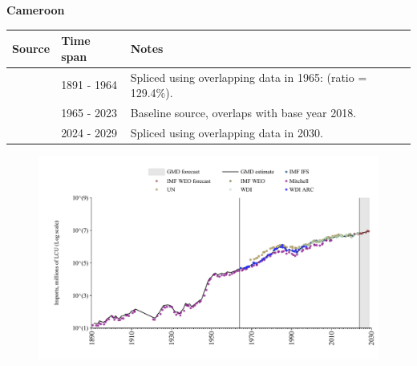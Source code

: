 \documentclass[12pt,a4paper,landscape]{article}
\begin{document}
\begin{adjustbox}{max totalsize={\paperwidth}{\paperheight},center}
\begin{minipage}[t][\textheight][t]{\textwidth}
\vspace*{0.5cm}
{}
\begin{center}
{\Large\bfseries Cameroon}
\end{center}
\vspace{0.5cm}
\begin{table}[H]
\centering
\small
\begin{tabular}{|l|l|l|}
\hline
\textbf{Source} & \textbf{Time span} & \textbf{Notes} \\
\hline
\rowcolor{white}\cite{Mitchell}& 1891 - 1964 &Spliced using overlapping data in 1965: (ratio = 129.4\%).\\
\rowcolor{lightgray}\cite{WDI}& 1965 - 2023 &Baseline source, overlaps with base year 2018.\\
\rowcolor{white}\cite{IMF_WEO_forecast}& 2024 - 2029 &Spliced using overlapping data in 2030.\\
\hline
\end{tabular}
\end{table}
\begin{figure}[H]
\centering
\includegraphics[width=\textwidth,height=0.6\textheight,keepaspectratio]{graphs/CMR_imports.pdf}
\end{figure}
\end{minipage}
\end{adjustbox}
\end{document}
